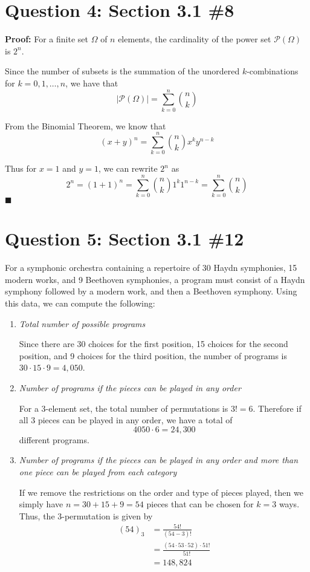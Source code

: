 \documentclass[11pt, oneside]{article}   	%
\newcommand*{\QEDA}{\hfill\ensuremath{\blacksquare}}         %
\begin{document}
\section*{Question 4: Section 3.1 \#8}

\textbf{Proof:} For a finite set $\Omega$ of $n$ elements, the cardinality of the power set $\mathcal{P}(\Omega)$ is $2^n$.

Since the number of subsets is the summation of the unordered $k$-combinations for $k=0,1, \ldots , n$, we have that
$$|\mathcal{P}(\Omega)| = \sum_{k=0}^n {n \choose k}$$

From the Binomial Theorem, we know that
$$(x+y)^n = \sum_{k=0}^n {n \choose k} x^k y^{n-k}$$

Thus for $x=1$ and $y=1$, we can rewrite $2^n$ as
$$2^n = (1+1)^n = \sum_{k=0}^n {n \choose k} 1^k 1^{n-k} =  \sum_{k=0}^n {n \choose k}$$ \QEDA


\section*{Question 5: Section 3.1 \#12}

For a symphonic orchestra containing a repertoire of 30 Haydn symphonies, 15 modern works, and 9 Beethoven symphonies, a program must consist of a Haydn symphony followed by a modern work, and then a Beethoven symphony. Using this data, we can compute the following:

\begin{enumerate}[\qquad (a)]
	\item \textit{Total number of possible programs}
	
	Since there are 30 choices for the first position, 15 choices for the second position, and 9 choices for the third position, the number of programs is $30 \cdot 15 \cdot 9 = 4,050$.
	
	\item \textit{Number of programs if the pieces can be played in any order}
	
	For a 3-element set, the total number of permutations is $3! = 6$. Therefore if all 3 pieces can be played in any order, we have a total of
	$$4050 \cdot 6 = 24,300$$
	different programs.
	
	\item \textit{Number of programs if the pieces can be played in any order and more than one piece can be played from each category}
	
	If we remove the restrictions on the order and type of pieces played, then we simply have $n=30+15+9=54$ pieces that can be chosen for $k=3$ ways. Thus, the $3$-permutation is given by
	\begin{align*}
	(54)_3 & = \frac{54!}{(54-3)!} \\
	& =\frac{(54 \cdot 53 \cdot 52) \cdot 51!}{51!} \\
	& = 148,824
	\end{align*}	
\end{enumerate}
\end{document}
